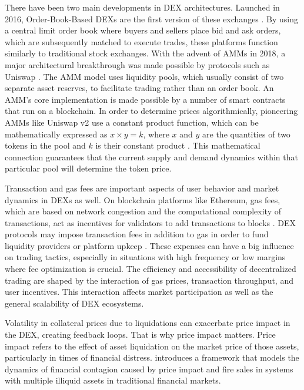 \documentclass[11pt]{article} %
\begin{document}
There have been two main developments in DEX architectures. Launched in 2016, Order-Book-Based DEXs are the first version of these exchanges \citep{daian20}. By using a central limit order book where buyers and sellers place bid and ask orders, which are subsequently matched to execute trades, these platforms function similarly to traditional stock exchanges. With the advent of AMMs in 2018, a major architectural breakthrough was made possible by protocols such as Uniswap \citep{angeris20}. The AMM model uses liquidity pools, which usually consist of two separate asset reserves, to facilitate trading rather than an order book. An AMM's core implementation is made possible by a number of smart contracts that run on a blockchain. In order to determine prices algorithmically, pioneering AMMs like Uniswap v2 use a constant product function, which can be mathematically expressed as $x \times y = k$, where $x$ and $y$ are the quantities of two tokens in the pool and $k$ is their constant product \citep{angeris21}. This mathematical connection guarantees that the current supply and demand dynamics within that particular pool will determine the token price.

Transaction and gas fees are important aspects of user behavior and market dynamics in DEXs as well. On blockchain platforms like Ethereum, gas fees, which are based on network congestion and the computational complexity of transactions, act as incentives for validators to add transactions to blocks \citep{cong21}. DEX protocols may impose transaction fees in addition to gas in order to fund liquidity providers or platform upkeep \citep{capponi21}. These expenses can have a big influence on trading tactics, especially in situations with high frequency or low margins where fee optimization is crucial. The efficiency and accessibility of decentralized trading are shaped by the interaction of gas prices, transaction throughput, and user incentives. This interaction affects market participation as well as the general scalability of DEX ecosystems.

Volatility in collateral prices due to liquidations can exacerbate price impact in the DEX, creating feedback loops. That is why price impact matters. Price impact refers to the effect of asset liquidation on the market price of those assets, particularly in times of financial distress. \cite{zach17} introduces a framework that models the dynamics of financial contagion caused by price impact and fire sales in systems with multiple illiquid assets in traditional financial markets.
\end{document}
